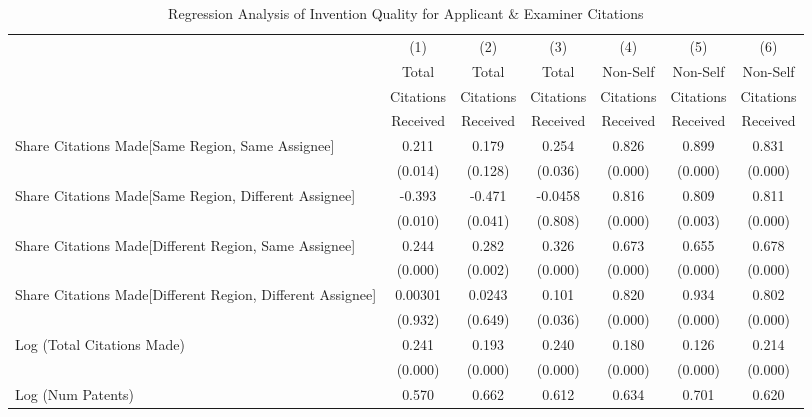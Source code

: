 \begin{table}[htbp]\centering \caption{Regression Analysis of Invention Quality for Applicant \& Examiner Citations \label{ae.model123192021}}
\scriptsize
\singlespacing
\begin{tabular}{l*{6}{c}} \hline
                &\multicolumn{1}{c}{(1)}&\multicolumn{1}{c}{(2)}&\multicolumn{1}{c}{(3)}&\multicolumn{1}{c}{(4)}&\multicolumn{1}{c}{(5)}&\multicolumn{1}{c}{(6)}\\
                &\multicolumn{1}{c}{Total}&\multicolumn{1}{c}{Total}&\multicolumn{1}{c}{Total}&\multicolumn{1}{c}{Non-Self}&\multicolumn{1}{c}{Non-Self}&\multicolumn{1}{c}{Non-Self}\\
                &\multicolumn{1}{c}{Citations}&\multicolumn{1}{c}{Citations}&\multicolumn{1}{c}{Citations}&\multicolumn{1}{c}{Citations}&\multicolumn{1}{c}{Citations}&\multicolumn{1}{c}{Citations}\\
                 &\multicolumn{1}{c}{Received}&\multicolumn{1}{c}{Received}&\multicolumn{1}{c}{Received}&\multicolumn{1}{c}{Received}&\multicolumn{1}{c}{Received}&\multicolumn{1}{c}{Received}\\
\hline
Share Citations Made[Same Region, Same Assignee]&    0.211&    0.179&    0.254&    0.826&    0.899&    0.831\\
                &  (0.014)&  (0.128)&  (0.036)&  (0.000)&  (0.000)&  (0.000)\\
Share Citations Made[Same Region, Different Assignee]&   -0.393&   -0.471&  -0.0458&    0.816&    0.809&    0.811\\
                &  (0.010)&  (0.041)&  (0.808)&  (0.000)&  (0.003)&  (0.000)\\
Share Citations Made[Different Region, Same Assignee]&    0.244&    0.282&    0.326&    0.673&    0.655&    0.678\\
                &  (0.000)&  (0.002)&  (0.000)&  (0.000)&  (0.000)&  (0.000)\\
Share Citations Made[Different Region, Different Assignee]&  0.00301&   0.0243&    0.101&    0.820&    0.934&    0.802\\
                &  (0.932)&  (0.649)&  (0.036)&  (0.000)&  (0.000)&  (0.000)\\
Log (Total Citations Made)&    0.241&    0.193&    0.240&    0.180&    0.126&    0.214\\
                &  (0.000)&  (0.000)&  (0.000)&  (0.000)&  (0.000)&  (0.000)\\
Log (Num Patents)&    0.570&    0.662&    0.612&    0.634&    0.701&    0.620\\

\end{tabular}
\end{table}
